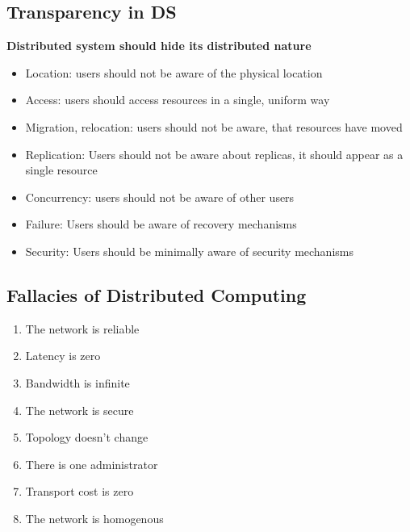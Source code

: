\subsection{Transparency in DS}
\textbf{Distributed system should hide its distributed nature}
\begin{itemize}
    \item Location: users should not be aware of the physical location
    \item Access: users should access resources in a single, uniform way
    \item Migration, relocation: users should not be aware, that resources have moved
    \item Replication: Users should not be aware about replicas, it should appear as a single resource
    \item Concurrency: users should not be aware of other users
    \item Failure: Users should be aware of recovery mechanisms
    \item Security: Users should be minimally aware of security mechanisms
\end{itemize}

\subsection{Fallacies of Distributed Computing}
\begin{enumerate}
    \item The network is reliable
    \item Latency is zero
    \item Bandwidth is infinite
    \item The network is secure
    \item Topology doesn't change
    \item There is one administrator
    \item Transport cost is zero
    \item The network is homogenous
\end{enumerate}